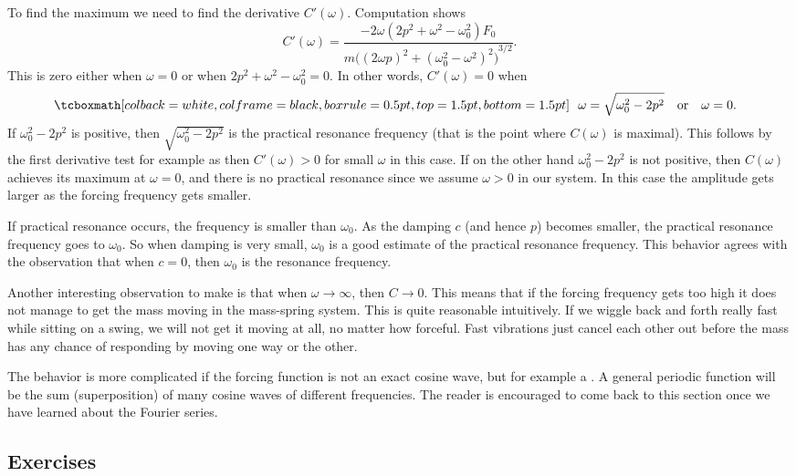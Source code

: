 To find the maximum we need to find the derivative $C'(\omega)$.
Computation shows
\begin{equation*}
C'(\omega) =
\frac{- 2\omega( 2p^2+\omega^2-\omega_0^2)F_0}
{m {\bigl({(2\omega p)}^2+{(\omega_0^2-\omega^2)}^2\bigr)}^{3/2}} .
\end{equation*}
This is zero either when $\omega = 0$ or when
$2p^2+\omega^2-\omega_0^2 = 0$.  In other words, $C'(\omega) = 0$ when
\begin{equation*}
\mybxbg{
~~
\omega = \sqrt{\omega_0^2 - 2p^2} \quad \text{or} \quad \omega = 0 .
~~
}
\end{equation*}
If $\omega_0^2 - 2p^2$ is positive, then
$\sqrt{\omega_0^2 - 2p^2}$ is the practical resonance frequency (that is the
point where $C(\omega)$ is maximal).  This follows by the first derivative
test for example as then $C'(\omega) > 0$ for small $\omega$ in this case.
If on the other hand $\omega_0^2 - 2p^2$ is not positive, then
$C(\omega)$ achieves its maximum at
$\omega=0$, and
there is no practical resonance since we assume $\omega > 0$
in our system.  In this case the amplitude gets larger as the forcing
frequency gets smaller.

If practical resonance occurs, the frequency is smaller than
$\omega_0$.  As the damping $c$ (and hence $p$) becomes smaller, the
practical resonance frequency
goes to $\omega_0$.  So when damping is very
small, $\omega_0$ is a good estimate of the practical resonance frequency.  This
behavior
agrees with the observation that when $c=0$, then $\omega_0$ is the resonance
frequency.

Another interesting observation to make is that when $\omega \to \infty$,
then $C \to 0$.  This means that if the forcing frequency gets too high it
does not manage to get the mass moving in the mass-spring system.  This is
quite reasonable intuitively.
If we wiggle back and forth really fast while sitting on a swing, we will
not get it moving at all, no matter how forceful.  Fast
vibrations just cancel each other out before the mass has any chance of
responding by moving one way or the other.

The behavior is more complicated if the forcing function is not an
exact cosine wave, but for example a .
A general periodic function will be the sum (superposition) of many
cosine waves of different frequencies.
The reader is encouraged to come
back to this section once we have learned about the Fourier series.

\subsection{Exercises}

